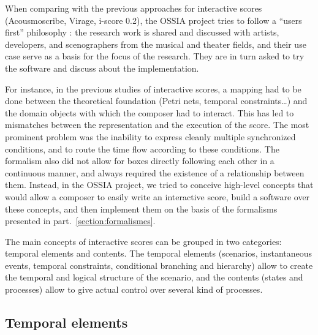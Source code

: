 \documentclass{article}
\begin{document}
	When comparing with the previous approaches for interactive scores (Acousmoscribe, Virage, i-score 0.2), the OSSIA pro\-ject tries to follow a ``users first'' philosophy : the research work is shared and discussed with artists, developers, and scenographers from the musical and theater fields, and their use case serve as a basis for the focus of the research. They are in turn asked to try the software and discuss about the implementation.
	
	For instance, in the previous studies of interactive scores, a mapping had to be done between the theoretical foundation (Petri nets, temporal constraints\dots) and the domain objects with which the composer had to interact.
	This has led to mismatches between the representation and the execution\cite{ariasexecuting} of the score. The most prominent problem was the inability to express cleanly multiple synchronized conditions, and to route the time flow according to these conditions. The formalism also did not allow for boxes directly following each other in a continuous manner, and always required the existence of a relationship between them. 
	Instead, in the OSSIA project, we tried to conceive high-level concepts that would allow a composer to easily write an interactive score, build a software over these concepts, and then implement them on the basis of the formalisms presented in part.~\ref{section:formalismes}.
	
	The main concepts of interactive scores can be grouped in two categories: temporal elements and contents.
	The temporal elements (scenarios, instantaneous events, temporal constraints, conditional branching and hierarchy) allow to create the temporal and logical structure of the scenario, and the contents (states and processes) allow to give actual control over several kind of processes.
	
	\subsection{Temporal elements}
	
\end{document}
